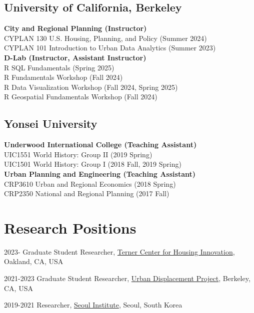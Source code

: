 \documentclass[12pt,letterpaper]{report}
\begin{document}
    \subsection*{University of California, Berkeley}
    \textbf{City and Regional Planning  (Instructor)}\\
      CYPLAN 130 U.S. Housing, Planning, and Policy (Summer 2024)\\
      CYPLAN 101 Introduction to Urban Data Analytics (Summer 2023)\\[0.6em]
    \textbf{D-Lab (Instructor, Assistant Instructor)}\\ 
      R SQL Fundamentals (Spring 2025)\\
      R Fundamentals Workshop (Fall 2024)\\
      R Data Visualization Workshop (Fall 2024, Spring 2025)\\
      R Geospatial Fundamentals Workshop (Fall 2024)

   \subsection*{Yonsei University}
   \textbf{Underwood International College (Teaching Assistant)}\\ 
    UIC1551 World History: Group II (2019 Spring)\\
    UIC1501 World History: Group I (2018 Fall, 2019 Spring)\\[0.6em]
  \textbf{Urban Planning and Engineering (Teaching Assistant)}\\ 
    CRP3610 Urban and Regional Economics (2018 Spring)\\
    CRP2350 National and Regional Planning (2017 Fall)

  \section*{Research Positions}
    \begin{tablist}
        \item[2023-] \tab{}Graduate Student Researcher, \href{https://ternercenter.berkeley.edu/}{Terner Center for Housing Innovation}, Oakland, CA, USA
        \item[2021-2023] \tab{}Graduate Student Researcher, \href{https://www.urbandisplacement.org/}{Urban Displacement Project}, Berkeley, CA, USA
        \item[2019-2021] \tab{}Researcher, \href{si.re.kr}{Seoul Institute}, Seoul, South Korea
    \end{tablist}
\end{document}

